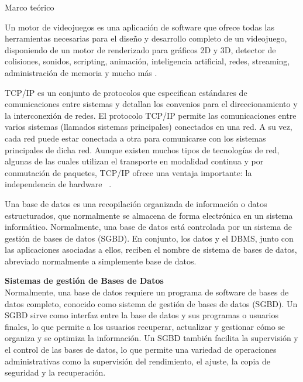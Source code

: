 \begin{thesischapter}{1} {Marco teórico}
    \vspace{10pt}

    \vspace{2pt}
    Un motor de videojuegos es una aplicación de software que ofrece todas las herramientas necesarias para el diseño y desarrollo completo de un videojuego, disponiendo de un motor de renderizado para gráficos 2D y 3D, detector de colisiones, sonidos, scripting, animación, inteligencia artificial, redes, streaming, administración de memoria y mucho más \cite{arce2011desarrollo}.
    
    \vspace{10pt}
    TCP/IP es un conjunto de protocolos que especifican estándares de comunicaciones entre sistemas y detallan los convenios para el direccionamiento y la interconexión de redes. El protocolo TCP/IP permite las comunicaciones entre varios sistemas (llamados sistemas principales) conectados en una red. A su vez, cada red puede estar conectada a otra para comunicarse con los sistemas principales de dicha red. Aunque existen muchos tipos de tecnologías de red, algunas de las cuales utilizan el transporte en modalidad continua y por conmutación de paquetes, TCP/IP ofrece una ventaja importante: la independencia de hardware ~\cite{protocolo-tcp-ip}.

    \vspace{10pt}
    Una base de datos es una recopilación organizada de información o datos estructurados, que normalmente se almacena de forma electrónica en un sistema informático. Normalmente, una base de datos está controlada por un sistema de gestión de bases de  datos (SGBD). En conjunto, los datos y el DBMS, junto con las aplicaciones asociadas a ellos, reciben el nombre de sistema de bases de datos, abreviado normalmente a simplemente base de datos.~\cite{Quéesuna68}

    \vspace{10pt}
    \textbf{Sistemas de gestión de Bases de Datos} \\
    Normalmente, una base de datos requiere un programa de software de bases de datos completo, conocido como sistema de gestión de  bases de datos (SGBD). Un SGBD sirve como interfaz entre la base de datos y sus programas o usuarios finales, lo que permite a los  usuarios recuperar, actualizar y gestionar cómo se organiza y se optimiza la información. Un SGBD también facilita la supervisión y el control de las bases de datos, lo que permite una variedad de operaciones administrativas como la supervisión del rendimiento, el ajuste, la copia de seguridad y la recuperación.~\cite{Quéesuna68}


\end{thesischapter}
